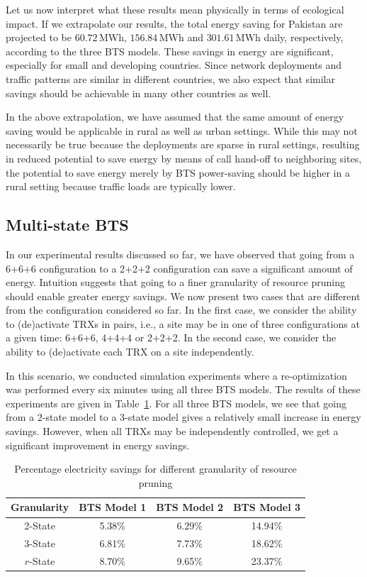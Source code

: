 Let us now interpret what these results mean physically in terms of ecological impact. If we extrapolate our results, the total energy saving for Pakistan are projected to be $60.72$\,MWh, $156.84$\,MWh and $301.61$\,MWh daily, respectively, according to the three BTS models. These savings in energy are significant, especially for small and developing countries. Since network deployments and traffic patterns are similar in different countries, we also expect that similar savings should be achievable in many other countries as well.

In the above extrapolation, we have assumed that the same amount of energy saving would be applicable in rural as well as urban settings. While this may not necessarily be true because the deployments are sparse in rural settings, resulting in reduced potential to save energy by means of call hand-off to neighboring sites, the potential to save energy merely by BTS power-saving should be higher in a rural setting because traffic loads are typically lower.

\subsection{Multi-state BTS}
\label{subsec:results2}
In our experimental results discussed so far, we have observed that going from a 6+6+6 configuration to a 2+2+2 configuration can save a significant amount of energy. Intuition suggests that going to a finer granularity of resource pruning should enable greater energy savings. We now present two cases that are different from the configuration considered so far. In the first case, we consider the ability to (de)activate TRXs in pairs, i.e., a site may be in one of three configurations at a given time: 6+6+6, 4+4+4 or 2+2+2. In the second case, we consider the ability to (de)activate each TRX on a site independently.

In this scenario, we conducted simulation experiments where a re-optimization was performed every six minutes using all three BTS models. The results of these experiments are given in Table~\ref{tab:granularityresults}. For all three BTS models, we see that going from a 2-state model to a 3-state model gives a relatively small increase in energy savings. However, when all TRXs may be independently controlled, we get a significant improvement in energy savings.

\begin{table}
\centering
\begin{tabular}{|c|c|c|c|}
\hline
Granularity & BTS Model 1 & BTS Model 2 & BTS Model 3\\
\hline 2-State & 5.38\% & 6.29\% &  14.94\% \\
\hline 3-State & 6.81\% & 7.73\% &  18.62\% \\
\hline $r$-State & 8.70\% & 9.65\% &  23.37\% \\
\hline
\end{tabular}
\vspace{+0.1in}
\caption{Percentage electricity savings for different granularity of resource pruning}
\label{tab:granularityresults}
\end{table}

